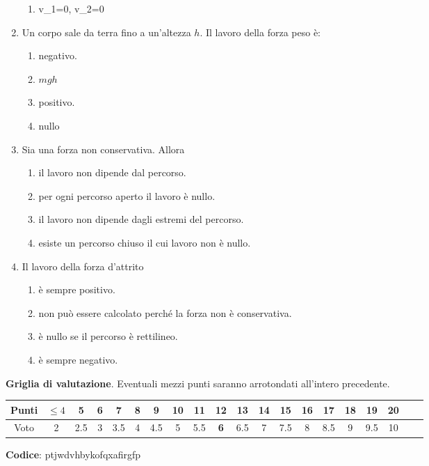 \documentclass{article}
\begin{document}
\begin{enumerate}
\begin{enumerate}[label=\Alph*.]
    \item v_1=0, v_2=0
  \end{enumerate}
  \item Un corpo sale da terra fino a un'altezza $h$. Il lavoro della forza peso è:
  \begin{enumerate}[label=\Alph*.]
    \item negativo.
    \item $mgh$
    \item positivo.
    \item nullo
  \end{enumerate}
  \item Sia  una forza non conservativa. Allora
  \begin{enumerate}[label=\Alph*.]
    \item il lavoro non dipende dal percorso.
    \item per ogni percorso aperto il lavoro è nullo.
    \item il lavoro non dipende dagli estremi del percorso.
    \item esiste un percorso chiuso il cui lavoro non è nullo.
  \end{enumerate}
  \item Il lavoro della forza d'attrito
  \begin{enumerate}[label=\Alph*.]
    \item è sempre positivo.
    \item non può essere calcolato perché la forza non è conservativa.
    \item è nullo se il percorso è rettilineo.
    \item è sempre negativo.
  \end{enumerate}
\end{enumerate}








\newpage \maketitle \centering \textbf{Griglia di valutazione}. Eventuali mezzi punti saranno arrotondati all'intero precedente. \begin{table}[h]     \centering \begin{tabular}{|c|c|c|c|c|c|c|c|c|c|c|c|c|c|c|c|c|c|c|c|} \hline Punti &  $\leq 4$ & 5 & 6 & 7 & 8 & 9 & 10 & 11 & \textbf{12} & 13 & 14 & 15 & 16 & 17 & 18 & 19 & 20 \\ \hline Voto & 2 & 2.5 & 3 & 3.5 & 4 & 4.5 & 5 & 5.5 & \textbf{6} & 6.5 & 7 & 7.5 & 8 & 8.5 & 9 & 9.5 & 10 \\ \hline \end{tabular} \end{table}
\textbf{Codice}: ptjwdvhbykofqxafirgfp
\end{document}
